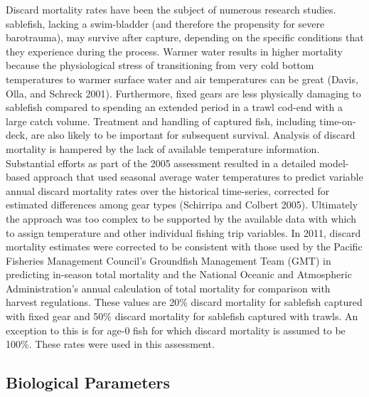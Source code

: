 \documentclass[11pt,
  english,
  a4paper,
]{article}
\begin{document}
Discard mortality rates have been the subject of numerous research studies. sablefish, lacking a swim-bladder (and therefore the propensity for severe barotrauma), may survive after capture, depending on the specific conditions that they experience during the process. Warmer water results in higher mortality because the physiological stress of transitioning from very cold bottom temperatures to warmer surface water and air temperatures can be great {(Davis, Olla, and Schreck 2001)\leavevmode\tagmcend\tagstructend}. Furthermore, fixed gears are less physically damaging to sablefish compared to spending an extended period in a trawl cod-end with a large catch volume. Treatment and handling of captured fish, including time-on-deck, are also likely to be important for subsequent survival. Analysis of discard mortality is hampered by the lack of available temperature information. Substantial efforts as part of the 2005 assessment resulted in a detailed model-based approach that used seasonal average water temperatures to predict variable annual discard mortality rates over the historical time-series, corrected for estimated differences among gear types {(Schirripa and Colbert 2005)\leavevmode\tagmcend\tagstructend}. Ultimately the approach was too complex to be supported by the available data with which to assign temperature and other individual fishing trip variables. In 2011, discard mortality estimates were corrected to be consistent with those used by the Pacific Fisheries Management Council's Groundfish Management Team (GMT) in predicting in-season total mortality and the National Oceanic and Atmospheric Administration's annual calculation of total mortality for comparison with harvest regulations. These values are 20\% discard mortality for sablefish captured with fixed gear and 50\% discard mortality for sablefish captured with trawls. An exception to this is for age-0 fish for which discard mortality is assumed to be 100\%. These rates were used in this assessment.

\leavevmode\tagmcend\tagstructend\par


\hypertarget{biological-parameters}{%
\subsection{Biological Parameters}\label{biological-parameters}}
\end{document}
